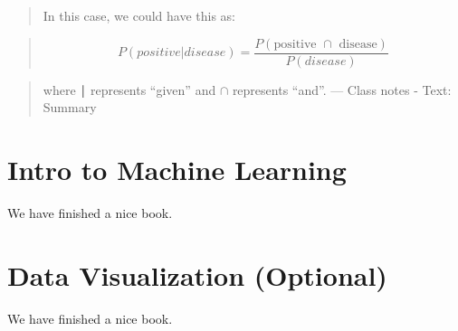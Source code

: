 \documentclass[]{book}
\begin{document}
\begin{quote}
In this case, we could have this as:
\end{quote}

\begin{quote}
\[P(positive|disease) = \frac{P(\text{positive }\cap\text{ disease})}{P(disease)}\]
\end{quote}

\begin{quote}
where ∣ represents ``given'' and \(\cap\) represents ``and''. --- Class
notes - Text: Summary
\end{quote}

\chapter{Intro to Machine Learning}\label{intro-to-machine-learning}

We have finished a nice book.

\chapter{Data Visualization
(Optional)}\label{data-visualization-optional}

We have finished a nice book.


\end{document}
